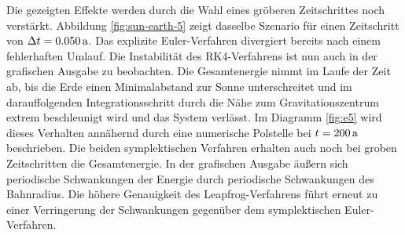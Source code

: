     Die gezeigten Effekte werden durch die Wahl eines gröberen Zeitschrittes noch verstärkt.
    Abbildung \ref{fig:sun-earth-5} zeigt dasselbe Szenario für einen Zeitschritt von $\Delta t = 0.050\,\mathrm{a}$.
    Das explizite Euler-Verfahren divergiert bereits nach einem fehlerhaften Umlauf.
    Die Instabilität des RK4-Verfahrens ist nun auch in der grafischen Ausgabe zu beobachten.
    Die Gesamtenergie nimmt im Laufe der Zeit ab, bis die Erde einen Minimalabstand zur Sonne unterschreitet und im darauffolgenden Integrationsschritt durch die Nähe zum Gravitationszentrum extrem beschleunigt wird und das System verlässt.
    Im Diagramm \ref{fig:e5} wird dieses Verhalten annähernd durch eine numerische Polstelle bei $t=200\,\mathrm{a}$ beschrieben.
    Die beiden symplektischen Verfahren erhalten auch noch bei groben Zeitschritten die Gesamtenergie.
    In der grafischen Ausgabe äußern sich periodische Schwankungen der Energie durch periodische Schwankungen des Bahnradius.
    Die höhere Genauigkeit des Leapfrog-Verfahrens führt erneut zu einer Verringerung der Schwankungen gegenüber dem symplektischen Euler-Verfahren.

